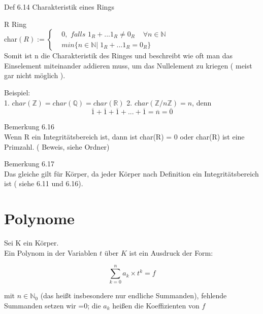 \documentclass[smallheadings,12pt,a4paper]{scrartcl}
\begin{document}
\begin{center}
\item[ Def 6.14 Charakteristik eines Rings ]
\end{center}
\item R Ring \\

char$(R):=  \begin{cases}
& 0, \textit{ falls } 1_R +... 1_R \neq 0_R \; \; \; \; \forall n \in \mathbb{N} \\
& min \{n\in \mathbb{N} | \; 1_R + ... 1_R = 0_R \} 
\end{cases}$ \\

Somit ist n die Charakteristik des Ringes und beschreibt wie oft man das Einselement miteinander addieren muss, um das Nullelement zu kriegen ( meist gar nicht möglich ).


\item Beispiel: \\
1. $\textit{char}(\mathbb{Z}) = \textit{char}(\mathbb{Q}) = \textit{char}(\mathbb{R})$
2. $\textit{char}(\mathbb{Z}/n \mathbb{Z}) = n $, denn \\
$$ \overline{1} + \overline{1} + \overline{1} + ... +  \overline{1} = \overline{n} = \overline{0} $$

\item Bemerkung 6.16 \\

Wenn R ein Integritätsbereich ist, dann ist char(R) = 0 oder char(R) ist eine Primzahl. ( Beweis, siehe Ordner)

\item Bemerkung 6.17 \\

Das gleiche gilt für Körper, da jeder Körper nach Definition ein Integritätsbereich ist ( siehe 6.11 und 6.16).

\newpage

\section*{Polynome}

\item Sei K ein Körper. \\
Ein Polynom in der Variablen $t$ über $K$ ist ein Ausdruck der Form: 

$$ \sum\limits_{k=0}^n a_k \times t^k = f $$

mit $n \in \mathbb{N}_0$ (das heißt insbesondere nur endliche Summanden), fehlende Summanden setzen wir =0; die $a_k$ heißen die Koeffizienten von $f$  \\
\end{document}
